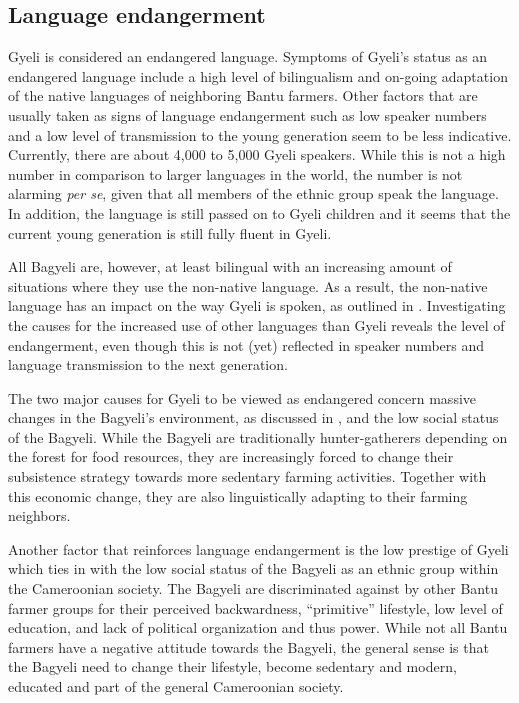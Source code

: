 \subsection{Language endangerment}
\label{sec:LangEnd}

Gyeli is considered an endangered language. 
Symptoms of Gyeli's status as an endangered language include a high level of bilingualism and on-going adaptation of the native languages of neighboring Bantu farmers. Other factors that are usually taken as signs of language endangerment such as low speaker numbers and a low level of transmission to the young generation seem to be less indicative. Currently, there are about 4,000 to 5,000 Gyeli speakers. While this is not a high number in comparison to larger languages in the world, the number is not alarming {\itshape per se}, given that all members of the ethnic group speak the language. In addition, the language is still passed on to Gyeli children and it seems that the current young generation is still fully fluent in Gyeli.

All Bagyeli are, however, at least bilingual with an increasing amount of situations where they use the non-native language. As a result, the non-native language has an impact on the way Gyeli is spoken, as outlined in . Investigating the causes for the increased use of other languages than Gyeli reveals the level of endangerment, even though this is not (yet) reflected in speaker numbers and language transmission to the next generation.

The two major causes for Gyeli to be viewed as endangered concern massive changes in the Bagyeli's environment, as discussed in , and the low social status of the Bagyeli. While the Bagyeli are traditionally hunter-gatherers depending on the forest for food resources, they are increasingly forced to change their subsistence strategy towards more sedentary farming activities.
Together with this economic change, they are also linguistically adapting to their farming neighbors.

Another factor that reinforces language endangerment is the low prestige of Gyeli which ties in with the low social status of the Bagyeli as an ethnic group within the Cameroonian society. The Bagyeli are discriminated against by other Bantu farmer groups for their  perceived backwardness, ``primitive'' lifestyle, low level of education, and lack of political organization and thus power. While not all Bantu farmers have a negative attitude towards the Bagyeli, the general sense is that the Bagyeli need to change their lifestyle, become sedentary and modern, educated and part of the general Cameroonian society. 

